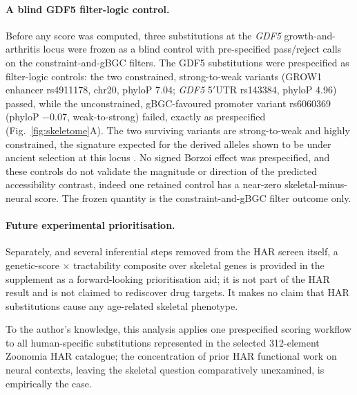 \documentclass[11pt]{article}
\begin{document}
\paragraph{A blind GDF5 filter-logic control.}
Before any score was computed, three substitutions at the \textit{GDF5} growth-and-arthritis locus
were frozen as a blind control with pre-specified pass/reject calls on the constraint-and-gBGC
filters. The GDF5 substitutions were prespecified as filter-logic controls: the two constrained,
strong-to-weak variants (GROW1 enhancer rs4911178, chr20, phyloP \num{7.04}; \textit{GDF5}
\num{5}$'$UTR rs143384, phyloP \num{4.96}) passed, while the unconstrained, gBGC-favoured promoter
variant rs6060369 (phyloP \num{-0.07}, weak-to-strong) failed, exactly as prespecified
(Fig.~\ref{fig:skeletome}A). The two surviving variants are strong-to-weak and highly constrained,
the signature expected for the derived alleles shown to be under ancient selection at this locus
\citep{capellini2017gdf5}. No signed Borzoi effect was prespecified, and these controls do not
validate the magnitude or direction of the predicted accessibility contrast, indeed one
retained control has a near-zero skeletal-minus-neural score. The frozen quantity is the
constraint-and-gBGC filter outcome only.

\paragraph{Future experimental prioritisation.}
Separately, and several inferential steps removed from the HAR screen itself, a genetic-score
$\times$ tractability composite over skeletal genes is provided in the supplement as a
forward-looking prioritisation aid; it is not part of the HAR result and is not claimed to
rediscover drug targets. It makes no claim that HAR substitutions cause any age-related skeletal
phenotype.

To the author's knowledge, this analysis applies one prespecified scoring workflow to all
human-specific substitutions represented in the selected \num{312}-element Zoonomia HAR catalogue;
the concentration of prior HAR functional work on neural contexts, leaving the skeletal question
comparatively unexamined, is empirically the case.


\newcommand{\figskeletome}{figs_full/fig_skeletome_results.pdf}
\end{document}
